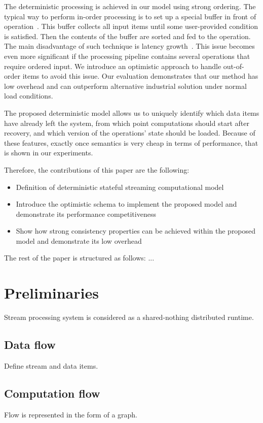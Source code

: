 \documentclass[sigconf]{acmart}
\theoremstyle{remark}
\begin{document}
The deterministic processing is achieved in our model using strong ordering. The typical way to perform in-order processing is to set up a special buffer in front of operation~\cite{Li:2008:OPN:1453856.1453890}. This buffer collects all input items until some user-provided condition is satisfied. Then the contents of the buffer are sorted and fed to the operation. The main disadvantage of such technique is latency growth~\cite{Zacheilas:2017:MDS:3093742.3093921}. This issue becomes even more significant if the processing pipeline contains several operations that require ordered input. We introduce an optimistic approach to handle out-of-order items to avoid this issue. Our evaluation demonstrates that our method has low overhead and can outperform alternative industrial solution under normal load conditions.

The proposed deterministic model allows us to uniquely identify which data items have already left the system, from which point computations should start after recovery, and which version of the operations' state should be loaded. Because of these features, exactly once semantics is very cheap in terms of performance, that is shown in our experiments.

Therefore, the contributions of this paper are the following:

\begin {itemize}
\item Definition of deterministic stateful streaming computational model 
\item Introduce the optimistic schema to implement the proposed model and demonstrate its performance competitiveness
\item Show how strong consistency properties can be achieved within the proposed model and demonstrate its low overhead
\end {itemize}

The rest of the paper is structured as follows: ...

\section{Preliminaries}
Stream processing system is considered as
a shared-nothing distributed runtime.

\subsection{Data flow}
Define stream and data items.

\subsection{Computation flow}
Flow is represented in the form of a graph.
\end{document}
